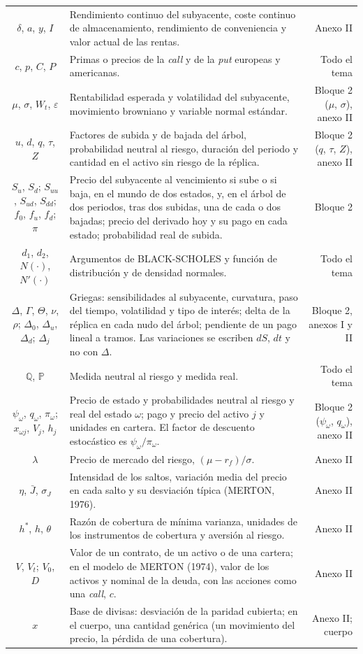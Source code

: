\documentclass[10pt,a4paper]{article}
\begin{document}
\begin{longtable}{SMD}
$\delta$, $a$, $y$, $I$ & Rendimiento continuo del subyacente, coste continuo de almacenamiento, rendimiento de conveniencia y valor actual de las rentas. & Anexo II\\
$c$, $p$, $C$, $P$ & Primas o precios de la \textit{call} y de la \textit{put} europeas y americanas. & Todo el tema\\
$\mu$, $\sigma$, $W_t$, $\varepsilon$ & Rentabilidad esperada y volatilidad del subyacente, movimiento browniano y variable normal estándar. & Bloque 2 ($\mu$, $\sigma$), anexo II\\
$u$, $d$, $q$, $\tau$, $Z$ & Factores de subida y de bajada del árbol, probabilidad neutral al riesgo, duración del periodo y cantidad en el activo sin riesgo de la réplica. & Bloque 2 ($q$, $\tau$, $Z$), anexo II\\
$S_u$, $S_d$; $S_{uu}$, $S_{ud}$, $S_{dd}$; $f_0$, $f_u$, $f_d$; $\pi$ & Precio del subyacente al vencimiento si sube o si baja, en el mundo de dos estados, y, en el árbol de dos periodos, tras dos subidas, una de cada o dos bajadas; precio del derivado hoy y su pago en cada estado; probabilidad real de subida. & Bloque 2\\
$d_1$, $d_2$, $N(\cdot)$, $N'(\cdot)$ & Argumentos de BLACK-SCHOLES y función de distribución y de densidad normales. & Todo el tema\\
$\Delta$, $\Gamma$, $\Theta$, $\nu$, $\rho$; $\Delta_0$, $\Delta_u$, $\Delta_d$; $\Delta_j$ & Griegas: sensibilidades al subyacente, curvatura, paso del tiempo, volatilidad y tipo de interés; delta de la réplica en cada nudo del árbol; pendiente de un pago lineal a tramos. Las variaciones se escriben $dS$, $dt$ y no con $\Delta$. & Bloque 2, anexos I y II\\
$\mathbb{Q}$, $\mathbb{P}$ & Medida neutral al riesgo y medida real. & Todo el tema\\
$\psi_\omega$, $q_\omega$, $\pi_\omega$; $x_{\omega j}$, $V_j$, $h_j$ & Precio de estado y probabilidades neutral al riesgo y real del estado $\omega$; pago y precio del activo $j$ y unidades en cartera. El factor de descuento estocástico es $\psi_\omega/\pi_\omega$. & Bloque 2 ($\psi_\omega$, $q_\omega$), anexo II\\
$\lambda$ & Precio de mercado del riesgo, $(\mu-r_f)/\sigma$. & Anexo II\\
$\eta$, $\bar J$, $\sigma_J$ & Intensidad de los saltos, variación media del precio en cada salto y su desviación típica (MERTON, 1976). & Anexo II\\
$h^*$, $h$, $\theta$ & Razón de cobertura de mínima varianza, unidades de los instrumentos de cobertura y aversión al riesgo. & Anexo II\\
$V$, $V_t$; $V_0$, $D$ & Valor de un contrato, de un activo o de una cartera; en el modelo de MERTON (1974), valor de los activos y nominal de la deuda, con las acciones como una \textit{call}, $c$. & Anexo II\\
$x$ & Base de divisas: desviación de la paridad cubierta; en el cuerpo, una cantidad genérica (un movimiento del precio, la pérdida de una cobertura). & Anexo II; cuerpo\\
\end{longtable}
\end{document}
